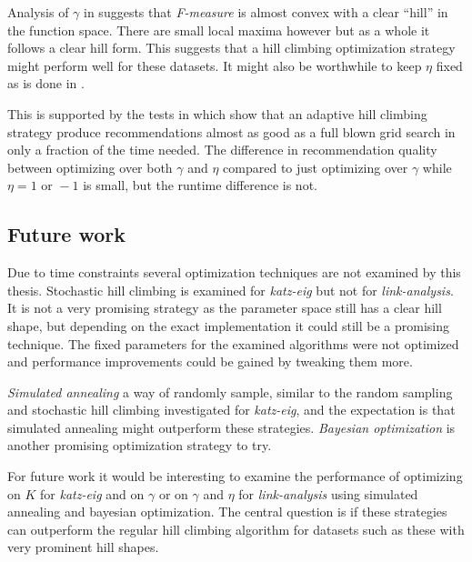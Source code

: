 Analysis of $\gamma$ in  suggests that \textit{F-measure} is almost convex with a clear ``hill'' in the function space. There are small local maxima however but as a whole it follows a clear hill form. This suggests that a hill climbing optimization strategy might perform well for these datasets. It might also be worthwhile to keep $\eta$ fixed as is done in \cite{huang2004link, huang2007comparison}.

This is supported by the tests in  which show that an adaptive hill climbing strategy produce recommendations almost as good as a full blown grid search in only a fraction of the time needed. The difference in recommendation quality between optimizing over both $\gamma$ and $\eta$ compared to just optimizing over $\gamma$ while $\eta = 1 \text{ or } -1$ is small, but the runtime difference is not.

\subsection{Future work}

Due to time constraints several optimization techniques are not examined by this thesis. Stochastic hill climbing is examined for \textit{katz-eig} but not for \textit{link-analysis}. It is not a very promising strategy as the parameter space still has a clear hill shape, but depending on the exact implementation it could still be a promising technique. The fixed parameters for the examined algorithms were not optimized and performance improvements could be gained by tweaking them more.

\textit{Simulated annealing} a way of randomly sample, similar to the random sampling and stochastic hill climbing investigated for \textit{katz-eig}, and the expectation is that simulated annealing might outperform these strategies. \textit{Bayesian optimization} is another promising optimization strategy to try.

For future work it would be interesting to examine the performance of optimizing on $K$ for \textit{katz-eig} and on $\gamma$ or on $\gamma$ and $\eta$ for \textit{link-analysis} using simulated annealing and bayesian optimization. The central question is if these strategies can outperform the regular hill climbing algorithm for datasets such as these with very prominent hill shapes.



